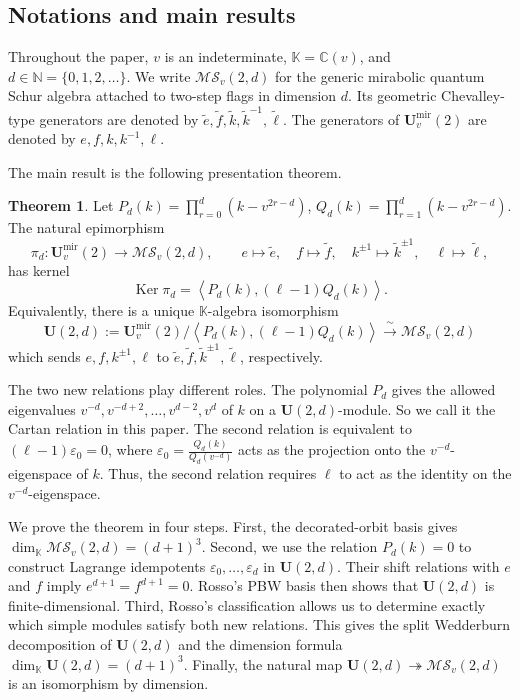 \documentclass[12pt]{amsart}
\numberwithin{equation}{section}
\theoremstyle{definition}
\newtheorem{theorem}{Theorem}[section]
\theoremstyle{definition}
\newcommand{\kk}{\mathbb K}
\newcommand{\Umir}{\mathbf U^{\mathrm{mir}}_v(2)}
\newcommand{\Ufd}{\mathbf U(2,d)}
\newcommand{\MS}{\mathcal{MS}_v(2,d)}
\newcommand{\te}{\widetilde e}
\newcommand{\tf}{\widetilde f}
\newcommand{\tk}{\widetilde k}
\newcommand{\tell}{\widetilde\ell}
\newcommand{\Ker}{\operatorname{Ker}}
\begin{document}
\subsection{Notations and main results}
Throughout the paper, $v$ is an indeterminate, $\kk=\mathbb C(v)$, and $d\in\mathbb N=\{0,1,2,\ldots\}$. We write $\MS$ for the generic mirabolic quantum Schur algebra attached to two-step flags in dimension $d$. Its geometric Chevalley-type generators are denoted by $\te,\tf,\tk,\tk^{-1},\tell$. The generators of $\Umir$ are denoted by $e,f,k,k^{-1},\ell$.

The main result is the following presentation theorem.
\begin{theorem}\label{thm:intro}
Let $P_d(k)=\prod_{r=0}^{d}(k-v^{2r-d})$, $Q_d(k)=\prod_{r=1}^{d}(k-v^{2r-d})$. The natural epimorphism
$$
\pi_d:\Umir\longrightarrow\MS,
\qquad
e\mapsto\te,\quad f\mapsto\tf,\quad k^{\pm 1}\mapsto{\tk}^{\pm 1},\quad \ell\mapsto\tell,
$$
has kernel
$$
\Ker\pi_d=
\left\langle P_d(k),(\ell-1)Q_d(k)\right\rangle.
$$
Equivalently, there is a unique $\kk$-algebra isomorphism
$$
\mathbf U(2,d):=
\Umir\Big/\left\langle P_d(k),(\ell-1)Q_d(k)\right\rangle
\xrightarrow{\ \sim\ }
\MS
$$
which sends $e,f,k^{\pm 1},\ell$ to $\te,\tf,{\tk}^{\pm 1},\tell$, respectively.
\end{theorem}

The two new relations play different roles.  The polynomial $P_d$ gives the allowed eigenvalues $v^{-d},v^{-d+2},\ldots,v^{d-2},v^d$ of $k$ on a $\Ufd$-module. So we call it the Cartan relation in this paper. The second relation is equivalent to $(\ell-1)\varepsilon_0=0$, where $\varepsilon_0=\frac{Q_d(k)}{Q_d(v^{-d})}$ acts as the projection onto the $v^{-d}$-eigenspace of $k$. 
Thus, the second relation requires $\ell$ to act as the identity on the $v^{-d}$-eigenspace.


We prove the theorem in four steps. First, the decorated-orbit basis gives $\dim_{\kk}\MS=(d+1)^3$. 
Second, we use the relation $P_d(k)=0$ to construct Lagrange idempotents $\varepsilon_0,\ldots,\varepsilon_d$ in $\Ufd$. Their shift relations with $e$ and $f$ imply $e^{d+1}=f^{d+1}=0$. Rosso's PBW basis then shows that $\Ufd$ is finite-dimensional. Third, Rosso's classification allows us to determine exactly which simple modules satisfy both new relations. This gives the split Wedderburn decomposition of $\Ufd$ and the dimension formula $\dim_{\kk}\Ufd=(d+1)^3$. 
Finally, the natural map $\Ufd\twoheadrightarrow\MS$ is an isomorphism by dimension.
\end{document}

